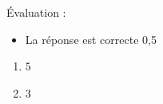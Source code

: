 %
%
    Évaluation :
    \begin{itemize}
        \item La réponse est correcte \hfill 0,5
    \end{itemize}
    \begin{enumerate}[cols=2]
        \item $5$
        \item $3$
    \end{enumerate}
